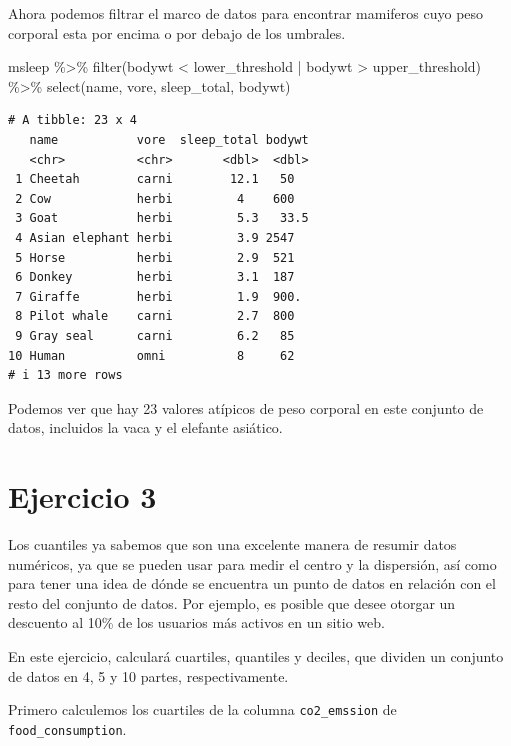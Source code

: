 \documentclass[
  letterpaper,
  DIV=11,
  numbers=noendperiod]{scrreprt}
\newenvironment{Shaded}{\begin{snugshade}}{\end{snugshade}}
\newcommand{\FunctionTok}[1]{\textcolor[rgb]{0.28,0.35,0.67}{#1}}
\newcommand{\NormalTok}[1]{\textcolor[rgb]{0.00,0.23,0.31}{#1}}
\newcommand{\SpecialCharTok}[1]{\textcolor[rgb]{0.37,0.37,0.37}{#1}}
\begin{document}
Ahora podemos filtrar el marco de datos para encontrar mamiferos cuyo
peso corporal esta por encima o por debajo de los umbrales.

\begin{Shaded}
\begin{Highlighting}[]
\NormalTok{msleep }\SpecialCharTok{\%\textgreater{}\%} \FunctionTok{filter}\NormalTok{(bodywt }\SpecialCharTok{\textless{}}\NormalTok{ lower\_threshold }\SpecialCharTok{|}\NormalTok{ bodywt }\SpecialCharTok{\textgreater{}}\NormalTok{ upper\_threshold) }\SpecialCharTok{\%\textgreater{}\%} 
  \FunctionTok{select}\NormalTok{(name, vore, sleep\_total, bodywt)}
\end{Highlighting}
\end{Shaded}

\begin{verbatim}
# A tibble: 23 x 4
   name           vore  sleep_total bodywt
   <chr>          <chr>       <dbl>  <dbl>
 1 Cheetah        carni        12.1   50  
 2 Cow            herbi         4    600  
 3 Goat           herbi         5.3   33.5
 4 Asian elephant herbi         3.9 2547  
 5 Horse          herbi         2.9  521  
 6 Donkey         herbi         3.1  187  
 7 Giraffe        herbi         1.9  900. 
 8 Pilot whale    carni         2.7  800  
 9 Gray seal      carni         6.2   85  
10 Human          omni          8     62  
# i 13 more rows
\end{verbatim}

Podemos ver que hay 23 valores atípicos de peso corporal en este
conjunto de datos, incluidos la vaca y el elefante asiático.

\hypertarget{ejercicio-3}{%
\section{Ejercicio 3}\label{ejercicio-3}}

Los cuantiles ya sabemos que son una excelente manera de resumir datos
numéricos, ya que se pueden usar para medir el centro y la dispersión,
así como para tener una idea de dónde se encuentra un punto de datos en
relación con el resto del conjunto de datos. Por ejemplo, es posible que
desee otorgar un descuento al 10\% de los usuarios más activos en un
sitio web.

En este ejercicio, calculará cuartiles, quantiles y deciles, que dividen
un conjunto de datos en 4, 5 y 10 partes, respectivamente.

Primero calculemos los cuartiles de la columna \texttt{co2\_emssion} de
\texttt{food\_consumption}.
\end{document}
